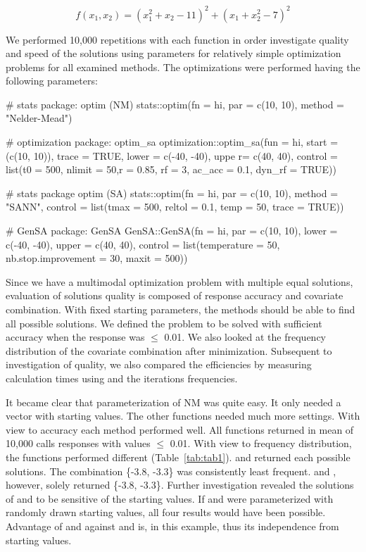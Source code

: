\begin{equation}
\label{eq:eq2}
f(x_1,x_2)=(x_1^2+x_2-11)^2+(x_1+x_2^2-7)^2
\end{equation}

We performed 10,000 repetitions with each function in order investigate quality and speed of the solutions using parameters for relatively simple optimization problems for all examined methods. The optimizations were performed having the following parameters:
    
    \begin{example}
# stats package: optim (NM)
stats::optim(fn = hi, par = c(10, 10), method = "Nelder-Mead")

# optimization package: optim_sa
optimization::optim_sa(fun = hi, start = (c(10, 10)), trace = TRUE, 
                       lower = c(-40, -40), uppe r= c(40, 40),
                       control = list(t0 = 500, nlimit = 50,r = 0.85,
                                      rf = 3, ac_acc = 0.1, dyn_rf = TRUE))

# stats package optim (SA)
stats::optim(fn = hi, par = c(10, 10), method = "SANN",
             control = list(tmax = 500, reltol = 0.1, temp = 50, trace = TRUE))

# GenSA package: GenSA
GenSA::GenSA(fn = hi, par = c(10, 10), lower = c(-40, -40), upper = c(40, 40), 
             control = list(temperature = 50, nb.stop.improvement = 30, maxit = 500))
\end{example}
Since we have a multimodal optimization problem with multiple equal solutions, evaluation of solutions quality is composed of response accuracy and covariate combination. With fixed starting parameters, the methods should be able to find all possible solutions. We defined the problem to be solved with sufficient accuracy when the response was $\leq$ 0.01. We also looked at the frequency distribution of the covariate combination after minimization. Subsequent to investigation of quality, we also compared the efficiencies by measuring calculation times using  and the iterations frequencies.

It became clear that parameterization of NM was quite easy. It only needed a vector with starting values. The other functions needed much more settings. With view to accuracy each method performed well. All functions returned in mean of 10,000 calls responses with values $\leq$ 0.01. With view to frequency distribution, the functions performed different (Table~\ref{tab:tab1}).  and  returned each possible solutions.  The combination \{-3.8, -3.3\} was consistently least frequent.  and , however, solely returned \{-3.8, -3.3\}. Further investigation revealed the solutions of  and  to be sensitive of the starting values. If  and  were parameterized with randomly drawn starting values, all four results would have been possible. Advantage of  and  against  and  is, in this example, thus its independence from starting values.

